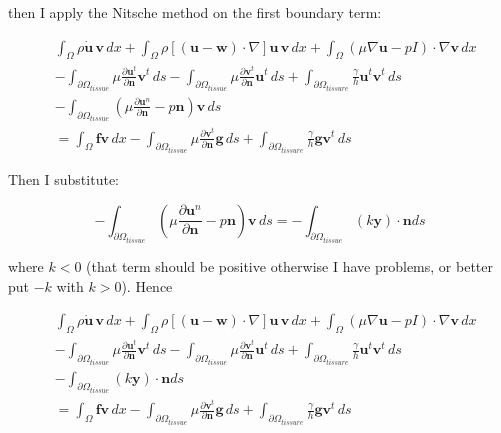 \documentclass[11pt,a4paper,titlepage]{report}
\begin{document}
then I apply the Nitsche method on the first boundary term: 

\begin{align*}
& \int_{\Omega} \rho \dot{\mathbf{u}} \, \mathbf{v} \, dx
+ \int_{\Omega} \rho [(\mathbf{u - w}) \cdot \nabla] \mathbf{u} \, \mathbf{v} \, dx
+ \int_{\Omega} (\mu \nabla \mathbf{u} - pI) \cdot \nabla \mathbf{v} \, dx \\
& - \int_{\partial \Omega_{tissue}} \mu \frac{\partial \mathbf{u}^t}{\partial \mathbf{n}} \mathbf{v}^t \, ds 
- \int_{\partial \Omega_{tissue}} \mu \frac{\partial \mathbf{v}^t}{\partial \mathbf{n}} \mathbf{u}^t \, ds 
+ \int_{\partial \Omega_{tissure}} \frac{\gamma}{h} \mathbf{u}^t \mathbf{v}^t \, ds \\
& - \int_{\partial \Omega_{tissue}} ( \mu \frac{\partial \mathbf{u}^n}{\partial \mathbf{n}} - p \mathbf{n} ) \mathbf{v} \, ds \\
& =  \int_{\Omega} \mathbf{f} \mathbf{v} \, dx
- \int_{\partial \Omega_{tissue}} \mu \frac{\partial \mathbf{v}^t}{\partial \mathbf{n}} \mathbf{g} \, ds 
+ \int_{\partial \Omega_{tissure}} \frac{\gamma}{h} \mathbf{g} \mathbf{v}^t \, ds
\end{align*}


Then I substitute:

\[
- \int_{\partial \Omega_{tissue}} ( \mu \frac{\partial \mathbf{u}^n}{\partial \mathbf{n}} - p \mathbf{n} ) \mathbf{v} \, ds
= - \int_{\partial \Omega_{tissue}} (k \mathbf{y}) \cdot \mathbf{n} ds 
\]

where $k < 0$ (that term should be positive otherwise I have problems, or better put $-k$ with $k>0$). Hence

\begin{align}
\label{eq:nitsche:5}
& \int_{\Omega} \rho \dot{\mathbf{u}} \, \mathbf{v} \, dx
+ \int_{\Omega} \rho [(\mathbf{u - w}) \cdot \nabla] \mathbf{u} \, \mathbf{v} \, dx
+ \int_{\Omega} (\mu \nabla \mathbf{u} - pI) \cdot \nabla \mathbf{v} \, dx \\
& - \int_{\partial \Omega_{tissue}} \mu \frac{\partial \mathbf{u}^t}{\partial \mathbf{n}} \mathbf{v}^t \, ds 
- \int_{\partial \Omega_{tissue}} \mu \frac{\partial \mathbf{v}^t}{\partial \mathbf{n}} \mathbf{u}^t \, ds 
+ \int_{\partial \Omega_{tissure}} \frac{\gamma}{h} \mathbf{u}^t \mathbf{v}^t \, ds \\
& - \int_{\partial \Omega_{tissue}} (k \mathbf{y}) \cdot \mathbf{n} ds  \\
& = \int_{\Omega} \mathbf{f} \mathbf{v} \, dx
- \int_{\partial \Omega_{tissue}} \mu \frac{\partial \mathbf{v}^t}{\partial \mathbf{n}} \mathbf{g} \, ds 
+ \int_{\partial \Omega_{tissure}} \frac{\gamma}{h} \mathbf{g} \mathbf{v}^t \, ds
\end{align}
\end{document}
